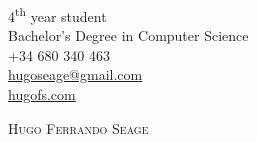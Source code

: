 \documentclass[a4paper, 11pt]{article}
\begin{document}
    \pagestyle{empty} %

    \begin{flushright}
        4\textsuperscript{th} year student\\
        Bachelor's Degree in Computer Science\\
        +34 680 340 463\\
        \href{mailto: hugoseage@gmail.com}{hugoseage@gmail.com}\\
        \href{https://hugofs.com}{hugofs.com}\\
    \end{flushright}

    \vspace{-40mm}

    \begin{figure}[ht!]
        \begin{flushleft}
        \end{flushleft}
    \end{figure}

    {\textsc {\Huge \vspace{5mm} \hspace{-13mm} Hugo Ferrando Seage}}\\
\end{document}
